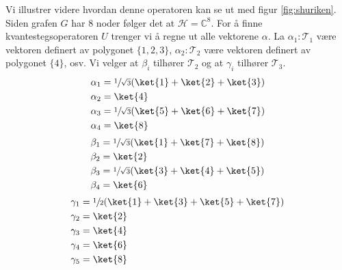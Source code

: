         Vi illustrer videre hvordan denne operatoren kan se ut med figur \ref{fig:shuriken}. Siden grafen $G$ har $8$ noder følger det at $\mathcal{H}=\mathbb{C}^8$. For å finne kvantestegsoperatoren $U$ trenger vi å regne ut alle vektorene $\alpha$. La $\alpha_1:\mathcal{T}_1$ være vektoren definert av polygonet $\{1,2,3\}$, $\alpha_2:\mathcal{T}_2$ være vektoren definert av polygonet $\{4\}$, osv. Vi velger at $\beta_i$ tilhører $\mathcal{T}_2$ og at $\gamma_i$ tilhører $\mathcal{T}_3$.
        \begin{align*}
            \alpha_1 & = \sfrac{1}{\sqrt{3}}(\ket{1}+\ket{2}+\ket{3}) \\
            \alpha_2 & = \ket{4} \\
            \alpha_3 & = \sfrac{1}{\sqrt{3}}(\ket{5}+\ket{6}+\ket{7}) \\
            \alpha_4 & = \ket{8}
        \end{align*}
        \begin{align*}
            \beta_1 & = \sfrac{1}{\sqrt{3}}(\ket{1}+\ket{7}+\ket{8}) \\
            \beta_2 & = \ket{2} \\
            \beta_3 & = \sfrac{1}{\sqrt{3}}(\ket{3}+\ket{4}+\ket{5}) \\
            \beta_4 & = \ket{6}
        \end{align*}
        \begin{align*}
            \gamma_1 & = \sfrac{1}{2}(\ket{1}+\ket{3}+\ket{5}+\ket{7}) \\
            \gamma_2 & = \ket{2} \\
            \gamma_3 & = \ket{4} \\
            \gamma_4 & = \ket{6} \\
            \gamma_5 & = \ket{8}
        \end{align*}

